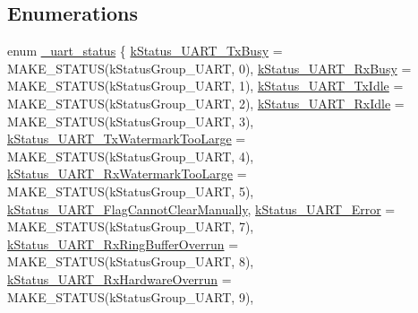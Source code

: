 \subsection*{Enumerations}
\begin{DoxyCompactItemize}
\item 
enum \mbox{\hyperlink{group__uart__driver_gacef40dc8e8ac174bfe40ebcbc980f84b}{\+\_\+uart\+\_\+status}} \{ \newline
\mbox{\hyperlink{group__uart__driver_ggacef40dc8e8ac174bfe40ebcbc980f84ba19ddee4fe5963467600028b78fb468e7}{k\+Status\+\_\+\+U\+A\+R\+T\+\_\+\+Tx\+Busy}} = M\+A\+K\+E\+\_\+\+S\+T\+A\+T\+US(k\+Status\+Group\+\_\+\+U\+A\+RT, 0), 
\mbox{\hyperlink{group__uart__driver_ggacef40dc8e8ac174bfe40ebcbc980f84ba68cf23f981c4b85f82291163fbb2a5e6}{k\+Status\+\_\+\+U\+A\+R\+T\+\_\+\+Rx\+Busy}} = M\+A\+K\+E\+\_\+\+S\+T\+A\+T\+US(k\+Status\+Group\+\_\+\+U\+A\+RT, 1), 
\mbox{\hyperlink{group__uart__driver_ggacef40dc8e8ac174bfe40ebcbc980f84baf36c829b1b889517bf775c0d7ce29fa6}{k\+Status\+\_\+\+U\+A\+R\+T\+\_\+\+Tx\+Idle}} = M\+A\+K\+E\+\_\+\+S\+T\+A\+T\+US(k\+Status\+Group\+\_\+\+U\+A\+RT, 2), 
\mbox{\hyperlink{group__uart__driver_ggacef40dc8e8ac174bfe40ebcbc980f84bae0877b14627ed2aa8ddb2bf5b033f407}{k\+Status\+\_\+\+U\+A\+R\+T\+\_\+\+Rx\+Idle}} = M\+A\+K\+E\+\_\+\+S\+T\+A\+T\+US(k\+Status\+Group\+\_\+\+U\+A\+RT, 3), 
\newline
\mbox{\hyperlink{group__uart__driver_ggacef40dc8e8ac174bfe40ebcbc980f84ba765913f003819ed87b861d187bf79ab8}{k\+Status\+\_\+\+U\+A\+R\+T\+\_\+\+Tx\+Watermark\+Too\+Large}} = M\+A\+K\+E\+\_\+\+S\+T\+A\+T\+US(k\+Status\+Group\+\_\+\+U\+A\+RT, 4), 
\mbox{\hyperlink{group__uart__driver_ggacef40dc8e8ac174bfe40ebcbc980f84ba720cefde05389830f35f6e6df6f6ac67}{k\+Status\+\_\+\+U\+A\+R\+T\+\_\+\+Rx\+Watermark\+Too\+Large}} = M\+A\+K\+E\+\_\+\+S\+T\+A\+T\+US(k\+Status\+Group\+\_\+\+U\+A\+RT, 5), 
\mbox{\hyperlink{group__uart__driver_ggacef40dc8e8ac174bfe40ebcbc980f84ba5ee8e23fc9ab20cf366942751b895f54}{k\+Status\+\_\+\+U\+A\+R\+T\+\_\+\+Flag\+Cannot\+Clear\+Manually}}, 
\mbox{\hyperlink{group__uart__driver_ggacef40dc8e8ac174bfe40ebcbc980f84ba950972a9e2ebbaa13c92e8f5a51f785d}{k\+Status\+\_\+\+U\+A\+R\+T\+\_\+\+Error}} = M\+A\+K\+E\+\_\+\+S\+T\+A\+T\+US(k\+Status\+Group\+\_\+\+U\+A\+RT, 7), 
\newline
\mbox{\hyperlink{group__uart__driver_ggacef40dc8e8ac174bfe40ebcbc980f84ba2e5b644b1e10c426af818bc78657e992}{k\+Status\+\_\+\+U\+A\+R\+T\+\_\+\+Rx\+Ring\+Buffer\+Overrun}} = M\+A\+K\+E\+\_\+\+S\+T\+A\+T\+US(k\+Status\+Group\+\_\+\+U\+A\+RT, 8), 
\mbox{\hyperlink{group__uart__driver_ggacef40dc8e8ac174bfe40ebcbc980f84bab6b1fd6c2deec25992449f5b12303a26}{k\+Status\+\_\+\+U\+A\+R\+T\+\_\+\+Rx\+Hardware\+Overrun}} = M\+A\+K\+E\+\_\+\+S\+T\+A\+T\+US(k\+Status\+Group\+\_\+\+U\+A\+RT, 9), 

\end{DoxyCompactItemize}
